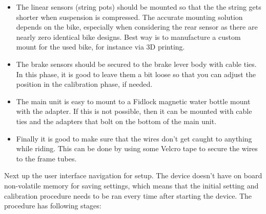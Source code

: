 \documentclass[a4paper,11pt]{article}
\begin{document}
\begin{itemize}
    \item The linear sensors (string pots) should be mounted so that the the string gets shorter when suspension is compressed. The accurate mounting solution depends on the bike, especially when considering the rear sensor as there are nearly zero identical bike designs. Best way is to manufacture a custom mount for the used bike, for instance via 3D printing.

    \item The brake sensors should be secured to the brake lever body with cable ties. In this phase, it is good to leave them a bit loose so that you can adjust the position in the calibration phase, if needed.

    \item The main unit is easy to mount to a Fidlock magnetic water bottle mount with the adapter. If this is not possible, then it can be mounted with cable ties and the adapters that bolt on the bottom of the main unit.

    \item Finally it is good to make sure that the wires don't get caught to anything while riding. This can be done by using some Velcro tape to secure the wires to the frame tubes.

\end{itemize}

Next up the user interface navigation for setup. The device doesn't have on board non-volatile memory for saving settings, which means that the initial setting and calibration procedure needs to be ran every time after starting the device. The procedure has following stages:
\end{document}
